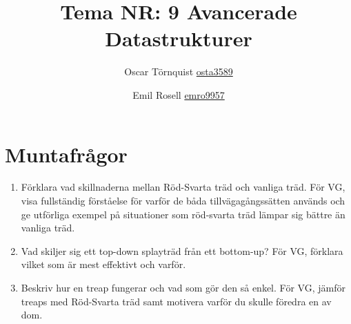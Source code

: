\documentclass[a5paper,10pt,oneside]{article}
\title{Tema NR: 9 Avancerade Datastrukturer}
\author{Oscar Törnquist \url{osta3589} \and Emil Rosell \url{emro9957}}
\begin{document}
\maketitle

\section*{Muntafrågor}
\begin{enumerate}
\item Förklara vad skillnaderna mellan Röd-Svarta träd och vanliga träd. För VG, visa fullständig förståelse för varför de båda tillvägagångssätten används och ge utförliga exempel på situationer som röd-svarta träd lämpar sig bättre än vanliga träd.
\item Vad skiljer sig ett top-down splayträd från ett bottom-up? För VG, förklara vilket som är mest effektivt och varför.
\item Beskriv hur en treap fungerar och vad som gör den så enkel. För VG, jämför treaps med Röd-Svarta träd samt motivera varför du skulle föredra en av dom.


\end{enumerate}
\end{document}
